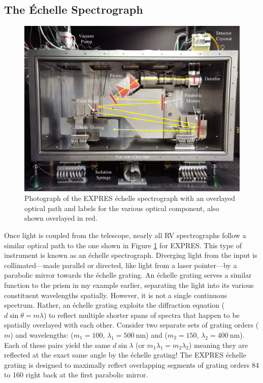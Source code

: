 \subsection{The \'Echelle Spectrograph} \label{intro:optics:echelle}

\begin{figure}
    \centering
    \includegraphics[width=\textwidth]{figures-1/expres.pdf}
    \caption{Photograph of the EXPRES \'echelle spectrograph with an overlayed optical path and labels for the various optical component, also shown overlayed in red.}
    \label{fig:expres}
\end{figure}

Once light is coupled from the telescope, nearly all RV spectrographs follow a similar optical path to the one shown in Figure \ref{fig:expres} for EXPRES. This type of instrument is known as an \'echelle spectrograph. Diverging light from the input is collimated---made parallel or directed, like light from a laser pointer---by a parabolic mirror towards the \'echelle grating. An \'echelle grating serves a similar function to the prism in my example earlier, separating the light into its various constituent wavelengths spatially. However, it is not a single continuous spectrum. Rather, an \'echelle grating exploits the diffraction equation ($d \sin{\theta} = m \lambda$) to reflect multiple shorter spans of spectra that happen to be spatially overlayed with each other. Consider two separate sets of grating orders ($m$) and wavelengths: ($m_1=100$, $\lambda_1=500~\mathrm{nm}$) and ($m_2=150$, $\lambda_2=400~\mathrm{nm}$). Each of these pairs yield the same $d\sin{\lambda}$ (or $m_1\lambda_1 = m_2\lambda_2$) meaning they are reflected at the exact same angle by the \'echelle grating! The EXPRES \'echelle grating is designed to maximally reflect overlapping segments of grating orders 84 to 160 right back at the first parabolic mirror.


